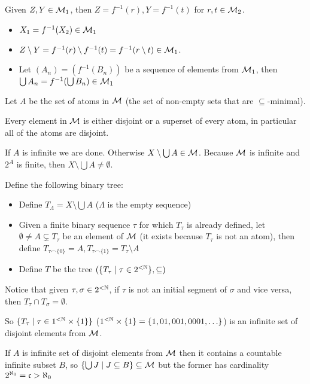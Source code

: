 \begin{cExercise}
	Given $Z,Y\in \cal M_1$, then $Z=f^{-1}(r), Y=f^{-1}(t)$ for $r,t\in\cal M_2$.
	
	\begin{itemize}
		\item $X_1=f^{-1}(X_2)\in \cal M_1$
		\item $Z\setminus Y=f^{-1}(r)\setminus f^{-1}(t)=f^{-1}(r\setminus t)\in\cal M_1$.
		\item Let $(A_n)=(f^{-1}(B_n))$ be a sequence of elements from $\cal M_1$, then $\bigcup A_n=f^{-1}(\bigcup B_n)\in\cal M_1$
	\end{itemize}
\end{cExercise}
\begin{cExercise}
	\begin{cPart}
		Let $A$ be the set of atoms in $\cal M$ (the set of non-empty sets that are $\subseteq$-minimal).
		
		Every element in $\cal M$ is either disjoint or a superset of every atom, in particular all of the atoms are disjoint.
		
		If $A$ is infinite we are done. Otherwise $X\setminus \bigcup A\in \cal M$. Because $\cal M$ is infinite and $2^A$ is finite, then $X\setminus \bigcup A\ne\emptyset$.
		
		Define the following binary tree:
		
		\begin{itemize}
			\item Define $T_{\Lambda}=X\setminus \bigcup A$ ($\Lambda$ is the empty sequence)
			\item Given a finite binary sequence $\tau$ for which $T_\tau$ is already defined, let $\emptyset\ne A\subsetneq T_\tau$ be an element of $\cal M$ (it exists because $T_\tau$ is not an atom), then define $T_{\tau\frown\{0\}}=A,T_{\tau\frown\{1\}}=T_\tau\setminus A$
			\item Define $T$ be the tree $(\{T_\tau\mid \tau\in 2^{<\N}\},\subseteq)$ 
		\end{itemize}
		
		Notice that given $\tau,\sigma\in 2^{<\N}$, if $\tau$ is not an initial segment of $\sigma$ and vice versa, then $T_\tau\cap T_\sigma=\emptyset$.
		
		So $\{T_\tau\mid \tau\in 1^{<\N}\times\{1\}\}$ ($1^{<\N}\times\{1\}=\{1, 01, 001, 0001,\ldots\}$) is an infinite set of disjoint elements from $\cal M$.
	\end{cPart}
	\begin{cPart}
		If $A$ is infinite set of disjoint elements from $\cal M$ then it contains a countable infinite subset $B$, so $\{\bigcup J\mid J\subseteq B\}\subseteq \cal M$ but the former has cardinality $2^{\aleph_0}=\frak c>\aleph_0$
	\end{cPart}
\end{cExercise}







